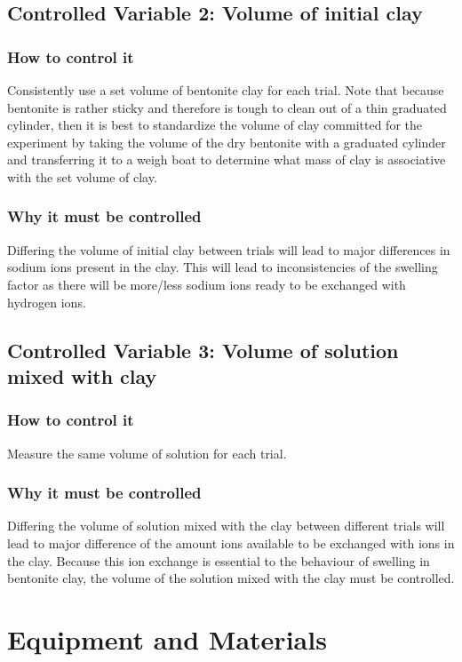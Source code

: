 \documentclass[11pt, letterpaper]{article}
\begin{document}
\subsection{Controlled Variable 2: Volume of initial clay}
\subsubsection{How to control it}
Consistently use a set volume of bentonite clay for each trial. Note
that because bentonite is rather sticky and therefore is tough
to clean out of a thin graduated cylinder, then it is best to
standardize the volume of clay committed for the experiment
by taking the volume of the dry bentonite with a graduated cylinder
and transferring it to a weigh boat to determine what mass of clay
is associative with the set volume of clay.
\subsubsection{Why it must be controlled}
Differing the volume of initial clay between trials will lead to
major differences in sodium ions present in the clay. This will
lead to inconsistencies of the swelling factor as there will
be more/less sodium ions ready to be exchanged with
hydrogen ions.

\subsection{Controlled Variable 3: Volume of solution mixed with clay}
\subsubsection{How to control it}
Measure the same volume of solution for each trial.
\subsubsection{Why it must be controlled}
Differing the volume of solution mixed with the clay between different
trials will lead to major difference of the amount  ions available to
be exchanged with  ions in the clay. Because this ion
exchange is essential to the behaviour of swelling in bentonite clay,
the volume of the solution mixed with the clay must be controlled.

\section{Equipment and Materials}
\end{document}
